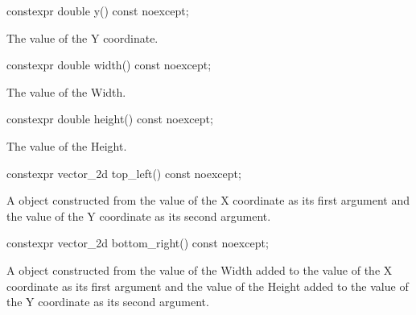 \begin{itemdecl}
constexpr double y() const noexcept;
\end{itemdecl}
\begin{itemdescr}
\pnum
\returns
The value of the Y coordinate.
\end{itemdescr}

\begin{itemdecl}
constexpr double width() const noexcept;
\end{itemdecl}
\begin{itemdescr}
\pnum
\returns
The value of the Width.
\end{itemdescr}

\begin{itemdecl}
constexpr double height() const noexcept;
\end{itemdecl}
\begin{itemdescr}
\pnum
\returns
The value of the Height.
\end{itemdescr}

\begin{itemdecl}
constexpr vector_2d top_left() const noexcept;
\end{itemdecl}
\begin{itemdescr}
\pnum
\returns
A  object constructed from the value of the X coordinate as its first argument and the value of the Y coordinate as its second argument.
\end{itemdescr}

\begin{itemdecl}
constexpr vector_2d bottom_right() const noexcept;
\end{itemdecl}
\begin{itemdescr}
\pnum
\returns
A  object constructed from the value of the Width added to the value of the X coordinate as its first argument and the value of the Height added to the value of the Y coordinate as its second argument.
\end{itemdescr}
